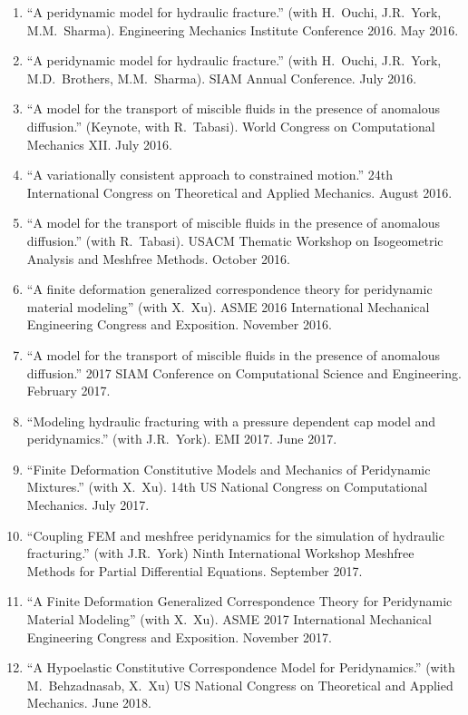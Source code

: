 \begin{enumerate}[resume]
    \item ``A peridynamic model for hydraulic fracture.'' (with H.\ Ouchi, J.R.\ York, M.M.\ Sharma). Engineering Mechanics Institute Conference 2016. May 2016.
    \item ``A peridynamic model for hydraulic fracture.'' (with H.\ Ouchi, J.R.\ York, M.D.\ Brothers, M.M.\ Sharma). SIAM Annual Conference.  July 2016.
    \item ``A model for the transport of miscible fluids in the presence of anomalous diffusion.'' (Keynote, with R.\ Tabasi). World Congress on Computational Mechanics XII.  July 2016.
    \item ``A variationally consistent approach to constrained motion.'' 24th International Congress on Theoretical and Applied Mechanics.  August 2016.
    \item ``A model for the transport of miscible fluids in the presence of anomalous diffusion.'' (with R.\ Tabasi). USACM Thematic Workshop on Isogeometric Analysis and Meshfree Methods.  October 2016.
    \item ``A finite deformation generalized correspondence theory for peridynamic material modeling'' (with X.\ Xu). ASME 2016 International Mechanical Engineering Congress and Exposition. November 2016.
    \item ``A model for the transport of miscible fluids in the presence of anomalous diffusion.'' 2017 SIAM Conference on Computational Science and Engineering.  February 2017.
    \item ``Modeling hydraulic fracturing with a pressure dependent cap model and peridynamics.'' (with J.R.\ York). EMI 2017. June 2017.
    \item ``Finite Deformation Constitutive Models and Mechanics of Peridynamic Mixtures.'' (with X.\ Xu). 14th US National Congress on Computational Mechanics. July 2017.
    \item ``Coupling FEM and meshfree peridynamics for the simulation of hydraulic fracturing.'' (with J.R.\ York) Ninth International Workshop Meshfree Methods for Partial Differential Equations. September 2017.
    \item ``A Finite Deformation Generalized Correspondence Theory for Peridynamic Material Modeling'' (with X.\ Xu). ASME 2017 International Mechanical Engineering Congress and Exposition. November 2017.
    \item ``A Hypoelastic Constitutive Correspondence Model for Peridynamics.'' (with M.\ Behzadnasab, X.\ Xu) US National Congress on Theoretical and Applied Mechanics. June 2018.

\end{enumerate}

